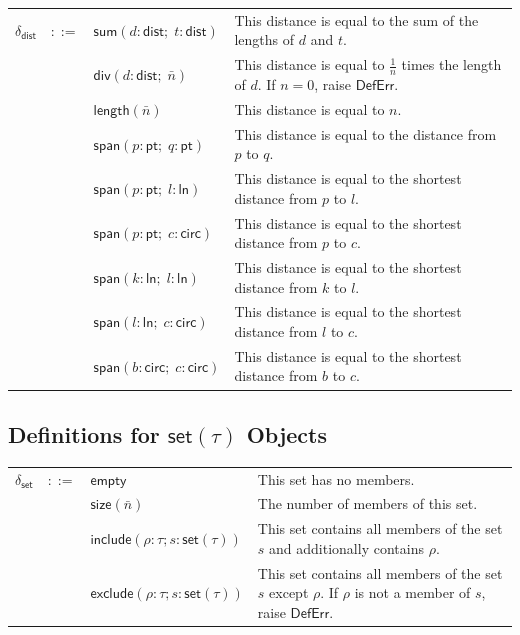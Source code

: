 \documentclass[twoside,11pt]{report}
\begin{document}
\begin{tabularx}{\textwidth}{l l l X}
$\delta_{\mathsf{dist}}$ & $::=$ & $\mathsf{sum}(d : \mathsf{dist}; \; t : \mathsf{dist})$ & This distance is equal to the sum of the lengths of $d$ and $t$. \\
 & & $\mathsf{div}(d : \mathsf{dist}; \; \bar{n})$ & This distance is equal to $\frac{1}{n}$ times the length of $d$. If $n = 0$, raise $\mathsf{DefErr}$. \\
 & & $\mathsf{length}(\bar{n})$ & This distance is equal to $n$.\\
 & & $\mathsf{span}(p : \mathsf{pt}; \; q : \mathsf{pt})$ & This distance is equal to the distance from $p$ to $q$. \\
 & & $\mathsf{span}(p : \mathsf{pt}; \; l : \mathsf{ln})$ & This distance is equal to the shortest distance from $p$ to $l$. \\
 & & $\mathsf{span}(p : \mathsf{pt}; \; c : \mathsf{circ})$ & This distance is equal to the shortest distance from $p$ to $c$. \\
 & & $\mathsf{span}(k : \mathsf{ln}; \; l : \mathsf{ln})$ & This distance is equal to the shortest distance from $k$ to $l$. \\
 & & $\mathsf{span}(l : \mathsf{ln}; \; c : \mathsf{circ})$ & This distance is equal to the shortest distance from $l$ to $c$. \\
 & & $\mathsf{span}(b : \mathsf{circ}; \; c : \mathsf{circ})$ & This distance is equal to the shortest distance from $b$ to $c$. \\

\end{tabularx}

\subsection{Definitions for $\mathsf{set}(\tau)$ Objects}
\label{subsec:def-set}

\begin{tabularx}{\textwidth}{l l l X}
$\delta_{\mathsf{set}}$ & $::=$ & $\mathsf{empty}$ & This set has no members. \\
 & & $\mathsf{size}(\bar{n})$ & The number of members of this set. \\
 & & $\mathsf{include}(\rho : \tau; s : \mathsf{set}(\tau))$ & This set contains all members of the set $s$ and additionally contains $\rho$. \\
 & & $\mathsf{exclude}(\rho : \tau; s : \mathsf{set}(\tau))$ & This set contains all members of the set $s$ except $\rho$. If $\rho$ is not a member of $s$, raise $\mathsf{DefErr}$.
\end{tabularx}
\end{document}
